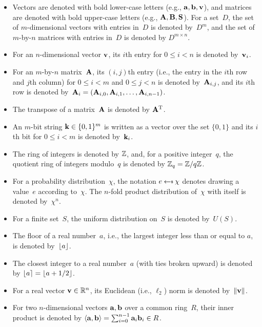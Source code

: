 \documentclass{iacrcc}
\begin{document}
\begin{itemize}
\item Vectors are denoted with bold lower-case letters (e.g.,
  $\mathbf{a}, \mathbf{b}, \mathbf{v}$), and matrices are denoted with bold upper-case
  letters (e.g., $\mathbf{A}, \mathbf{B}, \mathbf{S}$). For a set~$D$, the set of
  $m$-dimensional vectors with entries in~$D$ is denoted by~$D^{m}$,
  and the set of $m$-by-$n$ matrices with entries
  in~$D$ is denoted by $D^{m \times n}$.
\item For an $n$-dimensional vector $\mathbf{v}$, its $i$th entry for
  $0\leq i < n$ is denoted by~$\mathbf{v}_i$.
\item For an $m$-by-$n$ matrix~$\mathbf{A}$, its $(i,j)$th entry (i.e., the
  entry in the $i$th row and $j$th column) for $0 \leq i <m$ and
  $0 \leq j < n$ is denoted by~$\mathbf{A}_{i,j}$, and its $i$th row is
  denoted by~$\mathbf{A}_i = (\mathbf{A}_{i,0},\mathbf{A}_{i,1},\ldots,\mathbf{A}_{i,n-1})$.
\item The transpose of a matrix~$\mathbf{A}$ is denoted by $\mathbf{A}^\text{T}$.  
\item An $m$-bit string $\mathbf{k}\in \{0,1\}^m$ is written as a vector over
  the set $\{0,1\}$ and its $i$th bit for
  $0 \leq i < m$ is denoted by~$\mathbf{k}_i$. 
\item The ring of integers is denoted by $\mathbb{Z}$, and, for a positive
  integer~$q$, the quotient ring of integers modulo~$q$ is denoted by
  $\mathbb{Z}_q = \mathbb{Z}/q\mathbb{Z}$.
\item For a probability distribution~$\chi$, the notation
  $e \getsr \chi$ denotes drawing a value~$e$ according to~$\chi$.
  The $n$-fold product distribution of~$\chi$ with itself is denoted
  by~$\chi^{n}$.
\item For a finite set~$S$, the uniform
  distribution on~$S$ is denoted by~$U(S)$.
\item The floor of a real number~$a$, i.e., the largest integer less
  than or equal to $a$, is denoted by~$\lfloor a\rfloor$.
\item The closest integer to a real number~$a$ (with ties broken
  upward) is denoted by $\lfloor a\rceil = \lfloor a+1/2\rfloor$.
\item For a real vector $\mathbf{v}\in \mathbb{R}^n$, its Euclidean (i.e.,
  $\ell_{2}$) norm is denoted by~$\lVert\mathbf{v}\rVert$.
\item For two $n$-dimensional vectors $\mathbf{a}, \mathbf{b}$ over a common
  ring~$R$, their inner product is denoted by
  $\langle\mathbf{a}, \mathbf{b}\rangle = \sum_{i=0}^{n-1} \mathbf{a}_{i} \mathbf{b}_{i} \in
  R$.
\end{itemize}

\else
\end{document}
